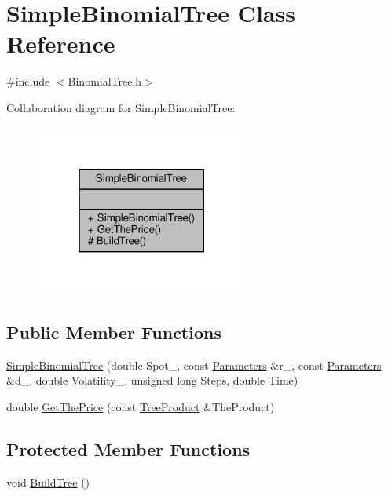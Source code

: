 \hypertarget{classSimpleBinomialTree}{}\section{Simple\+Binomial\+Tree Class Reference}
\label{classSimpleBinomialTree}


{\ttfamily \#include $<$Binomial\+Tree.\+h$>$}



Collaboration diagram for Simple\+Binomial\+Tree\+:
\nopagebreak
\begin{figure}[H]
\begin{center}
\leavevmode
\includegraphics[width=199pt]{classSimpleBinomialTree__coll__graph}
\end{center}
\end{figure}
\subsection*{Public Member Functions}
\begin{DoxyCompactItemize}
\item 
\hyperlink{classSimpleBinomialTree_af375f6a3371a0a69ac55d93b3b6ca610}{Simple\+Binomial\+Tree} (double Spot\+\_\+, const \hyperlink{classParameters}{Parameters} \&r\+\_\+, const \hyperlink{classParameters}{Parameters} \&d\+\_\+, double Volatility\+\_\+, unsigned long Steps, double Time)
\item 
double \hyperlink{classSimpleBinomialTree_a8fbbcebf7f07fb4fd8b42ca00acd2805}{Get\+The\+Price} (const \hyperlink{classTreeProduct}{Tree\+Product} \&The\+Product)
\end{DoxyCompactItemize}
\subsection*{Protected Member Functions}
\begin{DoxyCompactItemize}
\item 
void \hyperlink{classSimpleBinomialTree_a6ca5a5c663d538af02a8316cd227e071}{Build\+Tree} ()
\end{DoxyCompactItemize}


